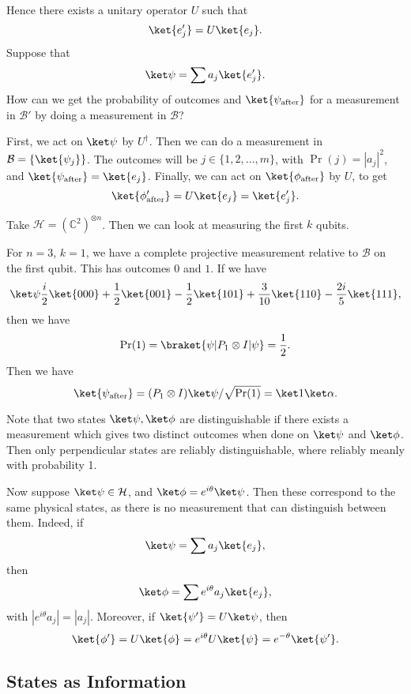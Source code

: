 \documentclass[12pt]{article}
\begin{document}
Hence there exists a unitary operator $U$ such that
\[
	\ket{e_j'} = U \ket{e_j}.
\]
Suppose that
\[
	\ket \psi = \sum a_j \ket {e_j'}.
\]
How can we get the probability of outcomes and $\ket{\psi_{\mathrm{after}}}$ for a measurement in $\mathcal{B}'$ by doing a measurement in $\mathcal{B}$?

First, we act on $\ket \psi$ by $U^{\dagger}$. Then we can do a measurement in $\mathcal{B} = \{\ket{\psi_j}\}$. The outcomes will be $j \in \{1, 2, \ldots, m\}$, with $\Pr(j) = |a_j|^2$, and $\ket{\psi_{\mathrm{after}}} = \ket{e_j}$. Finally, we can act on $\ket{\phi_{\mathrm{after}}}$ by $U$, to get
\[
	\ket{\phi'_{\mathrm{after}}} = U\ket{e_j} = \ket{e_j'}.
\]

\begin{exbox}
	Take $\mathcal{H} = (\mathbb{C}^2)^{\otimes n}$. Then we can look at measuring the first $k$ qubits.

	For $n = 3$, $k = 1$, we have a complete projective measurement relative to $\mathcal{B}$ on the first qubit. This has outcomes $0$ and $1$. If we have
	\[
		\ket \psi \frac{i}{2} \ket{000} + \frac{1}{2} \ket{001} - \frac{1}{2} \ket{101} + \frac{3}{10} \ket{110} - \frac{2i}{5} \ket{111},
	\]
	then we have
	\[
		\Pr(1) = \braket{\psi | P_1 \otimes I| \psi} = \frac{1}{2}.
	\]
	Then we have
	\[
	\ket{\psi_{\mathrm{after}}} = (P_1 \otimes I) \ket \psi / \sqrt{\Pr(1)} = \ket 1 \ket \alpha.
	\]
\end{exbox}

Note that two states $\ket \psi, \ket \phi$ are distinguishable if there exists a measurement which gives two distinct outcomes when done on $\ket \psi$ and $\ket \phi$. Then only perpendicular states are reliably distinguishable, where reliably meanly with probability 1.

Now suppose $\ket \psi \in \mathcal{H}$, and $\ket \phi = e^{i \theta} \ket \psi$. Then these correspond to the same physical states, as there is no measurement that can distinguish between them. Indeed, if
\[
	\ket \psi = \sum a_j \ket{e_j},
\]
then
\[
	\ket \phi = \sum e^{i \theta} a_j \ket {e_j},
\]
with $|e^{i \theta} a_j| = |a_j|$. Moreover, if $\ket{\psi'} = U \ket \psi$, then
\[
	\ket{\phi'} = U \ket{\phi} = e^{i\theta} U \ket{\psi} = e^{-\theta} \ket{\psi'}.
\]


\subsection{States as Information}
\label{sub:stat_info}
\end{document}
